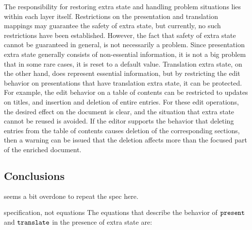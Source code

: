 The responsibility for restoring extra state and handling problem situations lies within each layer itself. Restrictions on the presentation and translation mappings may guarantee the safety of extra state, but currently, no such restrictions have been established. However, the fact that safety of extra state cannot be guaranteed in general, is not necessarily a problem. Since presentation extra state generally consists of non-essential information, it is not a big problem that in some rare cases, it is reset to a default value.  Translation extra state, on the other hand, does represent essential information, but by restricting the edit behavior on presentations that have translation extra state, it can be protected. For example, the edit behavior on a table of contents can be restricted to updates on titles, and insertion and deletion of entire entries. For these edit operations, the desired effect on the document is clear, and the situation that extra state cannot be reused is avoided. If the editor supports the behavior that deleting entries from the table of contents causes deletion of the corresponding sections, then a warning can be issued that the deletion affects more than the focused part of the enriched document. 





%																
\subsection{Conclusions}

\bc seems a bit overdone to repeat the spec here.

specification, not equations
The equations that describe the behavior of ${\tt present}$ and ${\tt translate}$ in the presence of extra state are:

